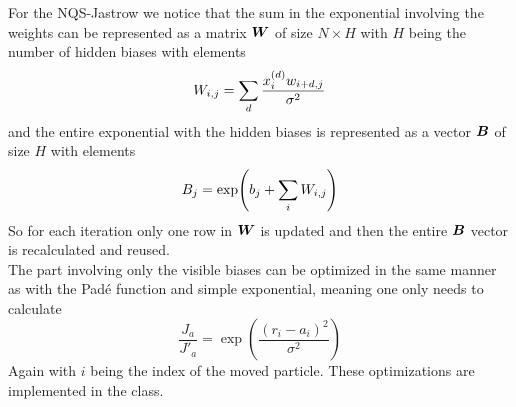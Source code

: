     For the NQS-Jastrow we notice that the sum in the exponential involving the
    weights can be represented as a matrix $\boldsymbol{{W}}$ of size $N\times H$ with
    $H$ being the number of hidden biases with elements
        \begin{equation}
            W_{i,j} = \sum\limits_{d}\frac{x^{(d)}_iw_{i+d,j}}{\sigma^2}
        \end{equation}
    and the entire exponential with the hidden biases is represented as a
    vector $\boldsymbol{{B}}$ of size $H$ with elements
        \begin{equation}
            B_j = \exp(b_j + \sum\limits_{i} W_{i,j})
        \end{equation}
    So for each iteration only one row in $\boldsymbol{{W}}$ is updated and then the
    entire $\boldsymbol{{B}}$ vector is recalculated and reused. \\ The part involving
    only the visible biases can be optimized in the same manner as with the
    Pad\'e function and simple exponential, meaning one only needs to
    calculate
        \begin{equation}
            \frac{J_a}{J'_a} = \exp(\frac{\left(r_i -
            a_i\right)^2}{\sigma^2})
        \end{equation}
    Again with $i$ being the index of the moved particle. These optimizations
    are implemented in the  class.

